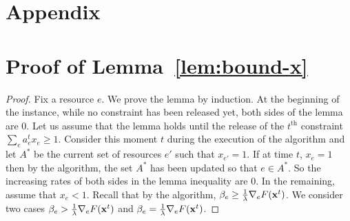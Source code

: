 
\section*{Appendix}

\section{Proof of Lemma~\ref{lem:bound-x}}
\label{appendix:main}

\setcounter{theorem}{3}
\BoundX*
\begin{proof}
Fix a resource $e$.
We prove the lemma by induction. At the beginning of the instance, while no constraint has been released yet,
both sides of the lemma are 0. Let us assume that the lemma holds until the release of the $t^{\text{th}}$ constraint $\sum_{e} a^{t}_{e} x_{e} \geq 1$.
Consider this moment $t$ during the execution of the algorithm
and let $A^{*}$ be the current set of resources $e'$ such that $x_{e'} = 1$.
If at time $t$, $x_{e} = 1$ then by the algorithm, the set $A^{*}$ has been updated so that
$e \in A^{*}$. So the increasing rates of both sides in the lemma inequality are 0.
In the remaining, assume that  $x_{e} < 1$.
Recall that by the algorithm, $\beta_{e} \geq \frac{1}{\lambda} \nabla_{e} F(\mathbf{x}^{t})$.
We consider two cases $\beta_{e} > \frac{1}{\lambda} \nabla_{e} F(\mathbf{x}^{t})$
and $\beta_{e} = \frac{1}{\lambda} \nabla_{e} F(\mathbf{x}^{t})$.


\end{proof}
